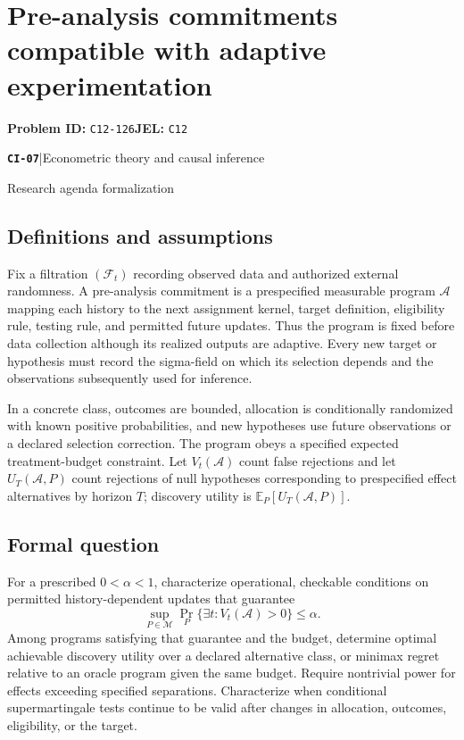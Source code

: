 \documentclass[11pt,a4paper]{article}
\newcommand{\E}{\mathbb E}
\newcommand{\entrymeta}[3]{{\sffamily\small\color{muted}\textbf{\texttt{#1}}\quad|\quad #2\par #3\par}}
\begin{document}
\section*{Pre-analysis commitments compatible with adaptive experimentation}
\textbf{Problem ID:} \texttt{C12-126}\quad \textbf{JEL:} \texttt{C12}\par
\label{problem:OP-0486}
\label{beyond:CI-07}
\entrymeta{CI-07}{Econometric theory and causal inference}{Research agenda formalization}
\subsection*{Definitions and assumptions}
Fix a filtration $(\mathcal F_t)$ recording observed data and authorized external randomness. A pre-analysis commitment is a prespecified measurable program $\mathcal A$ mapping each history to the next assignment kernel, target definition, eligibility rule, testing rule, and permitted future updates. Thus the program is fixed before data collection although its realized outputs are adaptive. Every new target or hypothesis must record the sigma-field on which its selection depends and the observations subsequently used for inference.

In a concrete class, outcomes are bounded, allocation is conditionally randomized with known positive probabilities, and new hypotheses use future observations or a declared selection correction. The program obeys a specified expected treatment-budget constraint. Let $V_t(\mathcal A)$ count false rejections and let $U_T(\mathcal A,P)$ count rejections of null hypotheses corresponding to prespecified effect alternatives by horizon $T$; discovery utility is $\E_P[U_T(\mathcal A,P)]$.
\subsection*{Formal question}
For a prescribed $0<\alpha<1$, characterize operational, checkable conditions on permitted history-dependent updates that guarantee
\[
\sup_{P\in\mathcal M}\Pr_P\{\exists t:V_t(\mathcal A)>0\}
\leq\alpha.
\]
Among programs satisfying that guarantee and the budget, determine optimal achievable discovery utility over a declared alternative class, or minimax regret relative to an oracle program given the same budget. Require nontrivial power for effects exceeding specified separations. Characterize when conditional supermartingale tests continue to be valid after changes in allocation, outcomes, eligibility, or the target.
\end{document}
